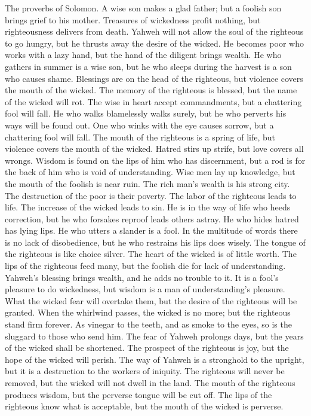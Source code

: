 The proverbs of Solomon. A wise son makes a glad father;
but a foolish son brings grief to his mother.  Treasures
of wickedness profit nothing, but righteousness delivers from death.
 Yahweh will not allow the soul of the righteous to go
hungry, but he thrusts away the desire of the wicked.  He
becomes poor who works with a lazy hand, but the hand of the diligent
brings wealth.  He who gathers in summer is a wise son,
but he who sleeps during the harvest is a son who causes shame.
 Blessings are on the head of the righteous, but violence
covers the mouth of the wicked.  The memory of the
righteous is blessed, but the name of the wicked will rot.
 The wise in heart accept commandments, but a chattering
fool will fall.  He who walks blamelessly walks surely,
but he who perverts his ways will be found out.  One who
winks with the eye causes sorrow, but a chattering fool will fall.
 The mouth of the righteous is a spring of life, but
violence covers the mouth of the wicked.  Hatred stirs up
strife, but love covers all wrongs.  Wisdom is found on
the lips of him who has discernment, but a rod is for the back of him
who is void of understanding.  Wise men lay up knowledge,
but the mouth of the foolish is near ruin.  The rich
man's wealth is his strong city. The destruction of the poor is their
poverty.  The labor of the righteous leads to life. The
increase of the wicked leads to sin.  He is in the way of
life who heeds correction, but he who forsakes reproof leads others
astray.  He who hides hatred has lying lips. He who
utters a slander is a fool.  In the multitude of words
there is no lack of disobedience, but he who restrains his lips does
wisely.  The tongue of the righteous is like choice
silver. The heart of the wicked is of little worth.  The
lips of the righteous feed many, but the foolish die for lack of
understanding.  Yahweh's blessing brings wealth, and he
adds no trouble to it.  It is a fool's pleasure to do
wickedness, but wisdom is a man of understanding's pleasure.
 What the wicked fear will overtake them, but the desire
of the righteous will be granted.  When the whirlwind
passes, the wicked is no more; but the righteous stand firm forever.
 As vinegar to the teeth, and as smoke to the eyes, so is
the sluggard to those who send him.  The fear of Yahweh
prolongs days, but the years of the wicked shall be shortened.
 The prospect of the righteous is joy, but the hope of
the wicked will perish.  The way of Yahweh is a
stronghold to the upright, but it is a destruction to the workers of
iniquity.  The righteous will never be removed, but the
wicked will not dwell in the land.  The mouth of the
righteous produces wisdom, but the perverse tongue will be cut off.
 The lips of the righteous know what is acceptable, but
the mouth of the wicked is perverse.

